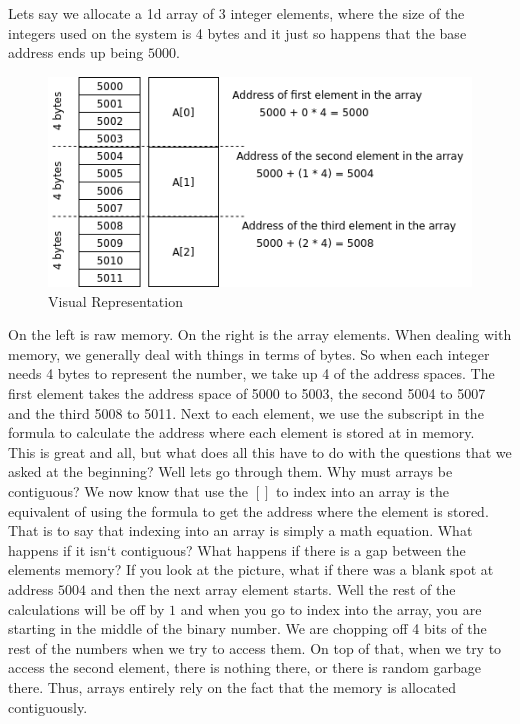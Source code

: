 \documentclass[11]{article}
\begin{document}
Lets say we allocate a 1d array of 3 integer elements, where the size of the integers used on the system is 4 bytes and it just so happens that the base address ends up being $5000$.


\begin{figure}[H]
	\centering
	\includegraphics[scale=0.75]{rawarrays.png}
	\caption{Visual Representation}
\end{figure}

On the left is raw memory. On the right is the array elements. When dealing with memory, we generally deal with things in terms of bytes. So when each integer needs 4 bytes to represent the number, we take up 4 of the address spaces. The first element takes the address space of 5000 to 5003, the second 5004 to 5007 and the third 5008 to 5011. Next to each element, we use the subscript in the formula to calculate the address where each element is stored at in memory.\\

This is great and all, but what does all this have to do with the questions that we asked at the beginning? Well lets go through them. Why must arrays be contiguous? We now know that use the $[ ]$ to index into an array is the equivalent of using the formula to get the address where the element is stored. That is to say that indexing into an array is simply a math equation. What happens if it isn`t contiguous? What happens if there is a gap between the elements memory? If you look at the picture, what if there was a blank spot at address $5004$ and then the next array element starts. Well the rest of the calculations will be off by $1$ and when you go to index into the array, you are starting in the middle of the binary number. We are chopping off 4 bits of the rest of the numbers when we try to access them. On top of that, when we try to access the second element, there is nothing there, or there is random garbage there. Thus, arrays entirely rely on the fact that the memory is allocated contiguously.\\
\end{document}

